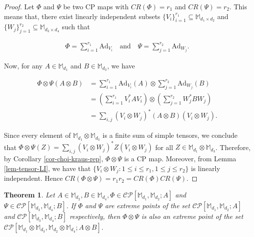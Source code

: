 \documentclass[10pt,reqno]{amsart}
\theoremstyle{definition}
\theoremstyle{plain}
\newtheorem{thm}[defn]{Theorem}
\theoremstyle{remark}
\newcommand{\mbb}[1]{\mathbb{#1}}
\newcommand{\msc}[1]{\mathscr{#1}}
\newcommand{\M}[1]{\mbb{M}_{#1}}%
\numberwithin{equation}{section}%
\begin{document}
   \begin{proof}
   	Let $\Phi$ and $\Psi$ be two CP maps with $CR(\Phi)=r_1$ and $CR(\Psi)=r_2$. This means that, there exist linearly independent subsets $\{V_i\}_{i=1}^{r_1}\subseteq\M{d_1\times d_2}$ and $\{W_j\}_{j=1}^{r_2}\subseteq\M{d_3\times d_4}$ such that
   	
   	\begin{align*}
   		\Phi=\sum_{i=1}^{r_1}\mathrm{Ad}_{V_i}\quad\text{and}\quad
   		\Psi=\sum_{j=1}^{r_2}\mathrm{Ad}_{W_j}.
   	\end{align*}
   	
   	Now, for any $A\in\M{d_1}$ and $B\in\M{d_3}$, we have
   	
   	\begin{align*}
   		\Phi\otimes\Psi(A\otimes B) &= \sum_{i=1}^{r_1}\mathrm{Ad}_{V_i}(A)\otimes\sum_{j=1}^{r_2}\mathrm{Ad}_{W_j}(B) \\
   		&= \left(\sum_{i=1}^{r_1}V_i^*AV_i\right)\otimes\left(\sum_{j=1}^{r_2}W_j^*BW_j\right) \\
   		&= \sum_{i,j}(V_i\otimes W_j)^*(A\otimes B)(V_i\otimes W_j).
   	\end{align*}
   	
   	Since every element of $\M{d_1}\otimes\M{d_3}$ is a finite sum of simple tensors, we conclude that $\Phi\otimes\Psi(Z) = \sum_{i,j}(V_i\otimes W_j)^*Z(V_i\otimes W_j)$ for all $Z\in\M{d_1}\otimes\M{d_3}$. Therefore, by Corollary \ref{cor-choi-kraus-rep}, $\Phi\otimes\Psi$ is a CP map. Moreover, from Lemma \ref{lem-tensor-LI}, we have that $\{V_i\otimes W_j: 1\leq i\leq r_1, 1\leq j\leq r_2\}$ is linearly independent. Hence $CR(\Phi\otimes\Psi)=r_1r_2=CR(\Phi)CR(\Psi)$.
   \end{proof}
   
   
   
   
   \begin{thm}
   	Let $A\in\M{d_2},B\in\M{d_4}, \Phi\in\msc{CP}[\M{d_1},\M{d_2}; A]$ and  $\Psi\in\msc{CP}[\M{d_3},\M{d_4}; B]$. If $\Phi$ and $\Psi$ are extreme points of the set $\msc{CP}[\M{d_1},\M{d_2}; A]$ and $\msc{CP}[\M{d_3},\M{d_4};B]$ respectively, then $\Phi\otimes \Psi$ is also an extreme point of the set $\msc{CP}[\M{d_1}\otimes\M{d_3},\M{d_2}\otimes\M{d_4}; A\otimes B]$.
   \end{thm}
   
\end{document}
